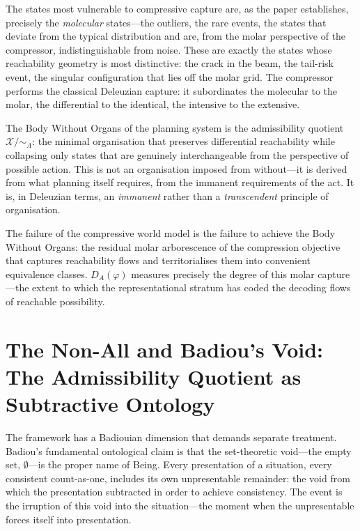 \documentclass[10pt,a4paper]{article}
\begin{document}
The states most vulnerable to compressive capture are, as the paper establishes,
precisely the \emph{molecular} states---the outliers, the rare events, the
states that deviate from the typical distribution and are, from the molar
perspective of the compressor, indistinguishable from noise. These are exactly
the states whose reachability geometry is most distinctive: the crack in the
beam, the tail-risk event, the singular configuration that lies off the molar
grid. The compressor performs the classical Deleuzian capture: it subordinates
the molecular to the molar, the differential to the identical, the intensive to
the extensive.

The Body Without Organs of the planning system is the admissibility quotient
$\mathcal{X}/{\sim_A}$: the minimal organisation that preserves differential
reachability while collapsing only states that are genuinely interchangeable
from the perspective of possible action. This is not an organisation imposed
from without---it is derived from what planning itself requires, from the
immanent requirements of the act. It is, in Deleuzian terms, an
\emph{immanent} rather than a \emph{transcendent} principle of organisation.

The failure of the compressive world model is the failure to achieve the Body
Without Organs: the residual molar arborescence of the compression objective
that captures reachability flows and territorialises them into convenient
equivalence classes. $D_A(\varphi)$ measures precisely the degree of this
molar capture---the extent to which the representational stratum has coded
the decoding flows of reachable possibility.

\section{The Non-All and Badiou's Void:\\
The Admissibility Quotient as Subtractive Ontology}

The framework has a Badiouian dimension that demands separate treatment.
Badiou's \citeyearpar{badiou1988being} fundamental ontological claim is that
the set-theoretic void---the empty set, $\emptyset$---is the proper name of
Being. Every presentation of a situation, every consistent count-as-one,
includes its own unpresentable remainder: the void from which the presentation
subtracted in order to achieve consistency. The event is the irruption of this
void into the situation---the moment when the unpresentable forces itself into
presentation.
\end{document}

